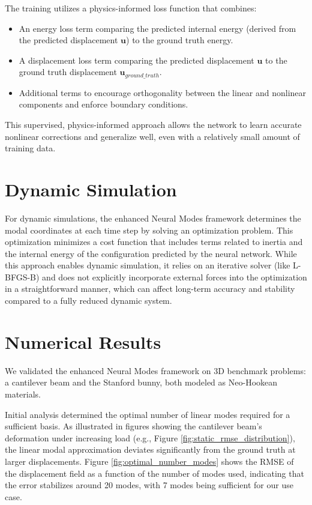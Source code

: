 \documentclass[11pt,a4paper,twocolumn]{article}
\begin{document}
The training utilizes a physics-informed loss function that combines:
\begin{itemize}
    \item An energy loss term comparing the predicted internal energy (derived from the predicted displacement $\bm{u}$) to the ground truth energy.
    \item A displacement loss term comparing the predicted displacement $\bm{u}$ to the ground truth displacement $\bm{u}_{ground\_truth}$.
    \item Additional terms to encourage orthogonality between the linear and nonlinear components and enforce boundary conditions.
\end{itemize}
This supervised, physics-informed approach allows the network to learn accurate nonlinear corrections and generalize well, even with a relatively small amount of training data.

\section{Dynamic Simulation}
\label{sec:es:dynamic_simulation}

For dynamic simulations, the enhanced Neural Modes framework determines the modal coordinates at each time step by solving an optimization problem. This optimization minimizes a cost function that includes terms related to inertia and the internal energy of the configuration predicted by the neural network. While this approach enables dynamic simulation, it relies on an iterative solver (like L-BFGS-B) and does not explicitly incorporate external forces into the optimization in a straightforward manner, which can affect long-term accuracy and stability compared to a fully reduced dynamic system.

\section{Numerical Results}
\label{sec:es:numerical_results}

We validated the enhanced Neural Modes framework on 3D benchmark problems: a cantilever beam and the Stanford bunny, both modeled as Neo-Hookean materials.

Initial analysis determined the optimal number of linear modes required for a sufficient basis. As illustrated in figures showing the cantilever beam's deformation under increasing load (e.g., Figure \ref{fig:static_rmse_distribution}), the linear modal approximation deviates significantly from the ground truth at larger displacements. Figure \ref{fig:optimal_number_modes} shows the RMSE of the displacement field as a function of the number of modes used, indicating that the error stabilizes around 20 modes, with 7 modes being sufficient for our use case.
\end{document}
